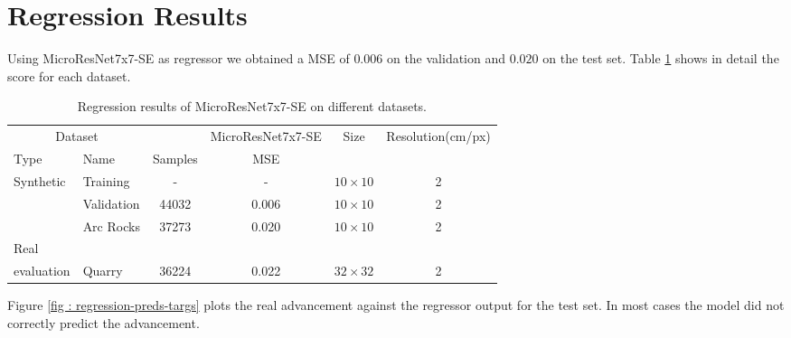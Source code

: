 \documentclass[../document.tex]{subfiles}
\begin{document}
\section{Regression Results}
Using MicroResNet7x7-SE as regressor we obtained a MSE of $0.006$ on the validation and $0.020$ on the test set. Table \ref{tab : regression-results} shows in detail the score for each dataset.
\begin{table}[htbp]
    \centering
    \begin{tabular}{@{}llcccc@{}}
    \toprule
    \multicolumn{2}{c}{Dataset} & & \multicolumn{1}{c}{MicroResNet7x7-SE} & Size & Resolution(cm/px) \\
    \cmidrule{1-2} \cmidrule{4-5}
    Type     &  Name  & Samples & MSE      & \\
    \toprule
      \multirow{3}{*}{Synthetic}  & Training  &  - & - &$10\times10$  & 2\\
      &  Validation   & 44032 &  0.006  &  $10\times10$ & 2 \\
      & Arc Rocks & 37273 & 0.020  &  $10\times10$& 2 \\
      \cmidrule{2-6}
    Real\\evaluation & Quarry & 36224 &  0.022 & $32\times32$ & 2\\
    \bottomrule   
\end{tabular}
\caption{Regression results of MicroResNet7x7-SE on different datasets.}
\label{tab : regression-results}
\end{table}
Figure \ref{fig : regression-preds-targs} plots the real advancement against the regressor output for the test set. In most cases the model did not correctly predict the advancement.
\end{document}
